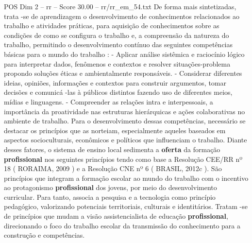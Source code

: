 \begin{textsample}{POS Dim 2 – rr – Score 30.00 – rr/rr\_em\_54.txt}
De forma mais sintetizadas, trata -se de aprendizagem o desenvolvimento de conhecimentos relacionados ao trabalho e atividades práticas, para aquisição de conhecimentos sobre as condições de como se configura o trabalho e, a compreensão da natureza do trabalho, permitindo o desenvolvimento contínuo das seguintes competências básicas para o mundo do trabalho : - Aplicar análise sistêmica e raciocínio lógico para interpretar dados, fenômenos e contextos e resolver situações-problema propondo soluções éticas e ambientalmente responsáveis. - Considerar diferentes ideias, opiniões, informações e contextos para construir argumentos, tomar decisões e comunicá -las à públicos distintos fazendo uso de diferentes meios, mídias e linguagens. - Compreender as relações intra e interpessoais, a importância da proatividade nas estruturas hierárquicas e ações colaborativas no ambiente de trabalho.
Para o desenvolvimento dessas competências, necessário se destacar os princípios que as norteiam, especialmente aqueles baseados em aspectos socioculturais, econômicos e políticos que influenciam o trabalho.
Diante desses fatores, o sistema de ensino local sedimenta a \textbf{oferta} da formação \textbf{profissional} nos seguintes princípios tendo como base a Resolução CEE/RR nº 18 ( RORAIMA, 2009 ) e a Resolução CNE nº 6 ( BRASIL, 2012c ).
São princípios que integram a formação escolar ao mundo do trabalho com o incentivo ao protagonismo \textbf{profissional} dos jovens, por meio do desenvolvimento curricular.
Para tanto, associa a pesquisa e a tecnologia como princípio pedagógico, valorizando potenciais territoriais, culturais e identitários.
Tratam -se de princípios que mudam a visão assistencialista de educação \textbf{profissional}, direcionando o foco do trabalho escolar da transmissão do conhecimento para a construção e competências.

\end{textsample}
